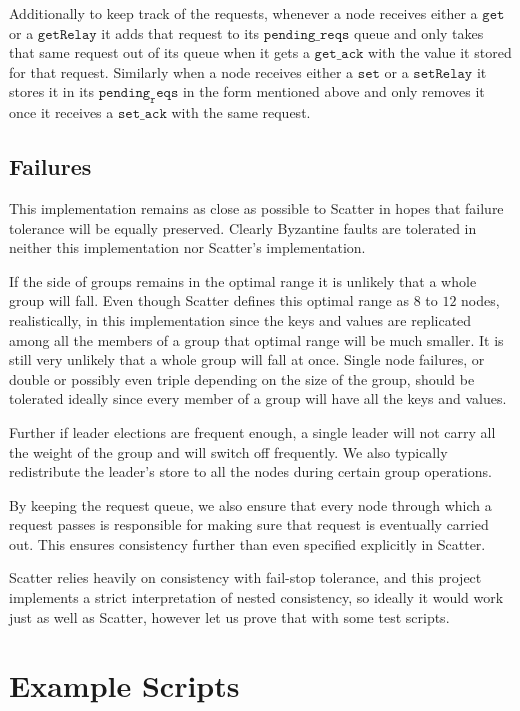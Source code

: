 \documentclass{amsart}
\theoremstyle{definition}
\theoremstyle{remark}
\numberwithin{equation}{section}
\begin{document}
Additionally to keep track of the requests, whenever a node receives either a $\mathtt{get}$ or a $\mathtt{getRelay}$ it adds that request to its $\mathtt{pending\_reqs}$ queue and only takes that same request out of its queue when it gets a $\mathtt{get\_ack}$ with the value it stored for that request. Similarly when a node receives either a $\mathtt{set}$ or a $\mathtt{setRelay}$ it stores it in its $\mathtt{pending_reqs}$ in the form mentioned above and only removes it once it receives a $\mathtt{set\_ack}$ with the same request.
\subsection{Failures}
This implementation remains as close as possible to Scatter in hopes that failure tolerance will be equally preserved. Clearly Byzantine faults are tolerated in neither this implementation nor Scatter's implementation.

If the side of groups remains in the optimal range it is unlikely that a whole group will fall. Even though Scatter defines this optimal range as $8$ to $12$ nodes, realistically, in this implementation since the keys and values are replicated among all the members of a group that optimal range will be much smaller. It is still very unlikely that a whole group will fall at once. Single node failures, or double or possibly even triple depending on the size of the group, should be tolerated ideally since every member of a group will have all the keys and values. 

Further if leader elections are frequent enough, a single leader will not carry all the weight of the group and will switch off frequently. We also typically redistribute the leader's store to all the nodes during certain group operations.

By keeping the request queue, we also ensure that every node through which a request passes is responsible for making sure that request is eventually carried out. This ensures consistency further than even specified explicitly in Scatter.

Scatter relies heavily on consistency with fail-stop tolerance, and this project implements a strict interpretation of nested consistency, so ideally it would work just as well as Scatter, however let us prove that with some test scripts.
\section{Example Scripts}
\end{document}
